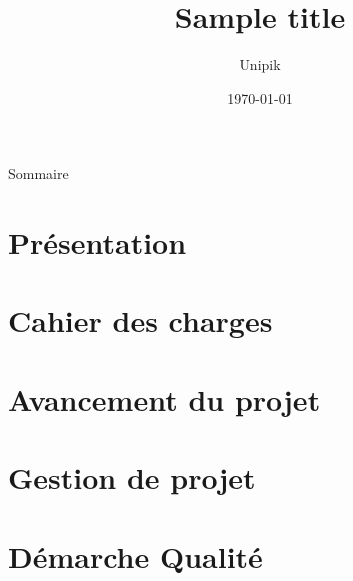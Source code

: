 \documentclass[compress,xcolor=dvipsnames]{beamer}
\title{Sample title}
\date{\today}
\author{Unipik}
\institute{\insa}
\begin{document}
\speaker{\Sergi} 

\begin{frame}[plain]
	\titlepage
\end{frame}

\begin{frame}{Sommaire}
	\tableofcontents[hideallsubsections]
\end{frame}
 

\speaker{\Sergi}
\section[Presentation]{Présentation}



\section[Cahier des charges]{Cahier des charges}


\speaker{\Sergi}
\section[Avancement]{Avancement du projet}


\speaker{\Sergi}
\section[Gestion projet]{Gestion de projet}



\speaker{\Sergi}
\section[Qualité]{Démarche Qualité}


 
\end{document}
